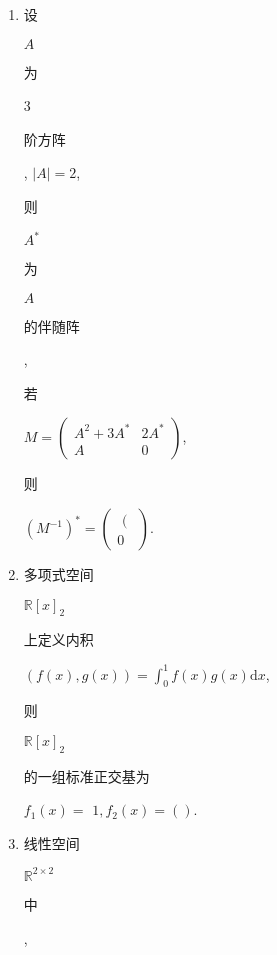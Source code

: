 \documentclass[10pt]{article}
\begin{document}
\begin{enumerate}
  \item \begin{CJK}{UTF8}{mj}设\end{CJK} $A$ \begin{CJK}{UTF8}{mj}为\end{CJK} 3 \begin{CJK}{UTF8}{mj}阶方阵\end{CJK}, $|A|=2$, \begin{CJK}{UTF8}{mj}则\end{CJK} $A^{*}$ \begin{CJK}{UTF8}{mj}为\end{CJK} $A$ \begin{CJK}{UTF8}{mj}的伴随阵\end{CJK}, \begin{CJK}{UTF8}{mj}若\end{CJK} $M=\left(\begin{array}{cc}A^{2}+3 A^{*} & 2 A^{*} \\ A & 0\end{array}\right)$, \begin{CJK}{UTF8}{mj}则\end{CJK} $\left(M^{-1}\right)^{*}=\left(\begin{array}{c}\text { ( } \\ 0\end{array}\right)$.

  \item \begin{CJK}{UTF8}{mj}多项式空间\end{CJK} $\mathbb{R}[x]_{2}$ \begin{CJK}{UTF8}{mj}上定义内积\end{CJK} $(f(x), g(x))=\int_{0}^{1} f(x) g(x) \mathrm{d} x$, \begin{CJK}{UTF8}{mj}则\end{CJK} $\mathbb{R}[x]_{2}$ \begin{CJK}{UTF8}{mj}的一组标准正交基为\end{CJK} $f_{1}(x)=$ $1, f_{2}(x)=()$.

  \item \begin{CJK}{UTF8}{mj}线性空间\end{CJK} $\mathbb{R}^{2 \times 2}$ \begin{CJK}{UTF8}{mj}中\end{CJK},

\end{enumerate}
\end{document}
